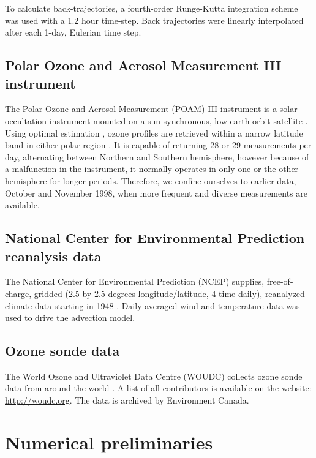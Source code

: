 \documentclass{article}
\begin{document}
To calculate back-trajectories, a fourth-order Runge-Kutta integration scheme
was used with a 1.2 hour time-step.
Back trajectories were linearly interpolated after each 1-day, Eulerian time step.

\subsection{Polar Ozone and Aerosol Measurement III instrument}

The Polar Ozone and Aerosol Measurement (POAM) III instrument is a solar-
occultation instrument mounted on a sun-synchronous, low-earth-orbit
satellite \citep{Lucke_etal1999}.  
Using optimal estimation \citep{Rodgers2000}, ozone profiles are retrieved 
within a narrow latitude band in either polar region \citep{Lumpe_etal2002}.  
It is capable of returning 28 or 29 measurements per day,
alternating between Northern and Southern hemisphere, however because of
a malfunction
in the instrument, it normally operates in only one or the other hemisphere for longer periods.  Therefore, we confine ourselves to earlier data,
October and November 1998, when more frequent and diverse measurements
are available.

\subsection{National Center for Environmental Prediction reanalysis data}

The National Center for Environmental Prediction (NCEP) supplies, 
free-of-charge,
gridded (2.5 by 2.5 degrees longitude/latitude, 4 time daily), reanalyzed 
climate data starting in 1948 \citep{Kalnay_etal1996}.
Daily averaged wind and temperature data was used to drive the advection model.

\subsection{Ozone sonde data}

The World Ozone and Ultraviolet Data Centre (WOUDC) collects ozone sonde data
from around the world \citep{Hare_etal2000}. A list of all contributors is available on the website:
\url{http://woudc.org}.
The data is archived by Environment Canada.


\section{Numerical preliminaries}
\end{document}
